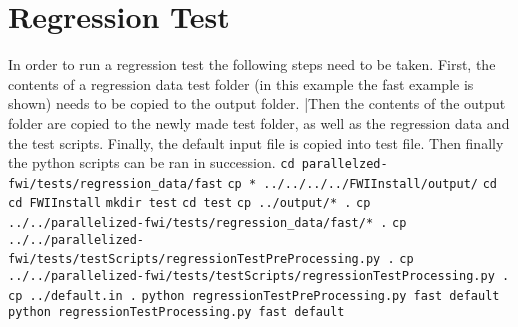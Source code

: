 \documentclass[10pt]{article}
\begin{document}
\section{Regression Test}
In order to run a regression test the following steps need to be taken. First, the contents of a regression data test folder (in this example the fast example is shown) needs to be copied to the output folder. |Then the contents of the output folder are copied to the newly made test folder, as well as the regression data and the test scripts. Finally, the default input file is copied into test file. Then finally the python scripts can be ran in succession.  
\newline
\texttt{cd parallelzed-fwi/tests/regression\_data/fast}
\newline
\texttt{cp * ../../../../FWIInstall/output/}
 \newline
\texttt{cd}
\newline
\texttt{cd FWIInstall}
\newline
\texttt{mkdir test}
 \newline
\texttt{cd test}
\newline
\texttt{cp ../output/* .}
\newline
\texttt{cp ../../parallelized-fwi/tests/regression\_data/fast/* .}
\newline
\texttt{cp ../../parallelized-fwi/tests/testScripts/regressionTestPreProcessing.py .}
\newline
\texttt{cp ../../parallelized-fwi/tests/testScripts/regressionTestProcessing.py .}
\newline
\texttt{cp ../default.in .}
\newline	
\texttt{python regressionTestPreProcessing.py fast default}
\newline
\texttt{python regressionTestProcessing.py fast default}
\end{document}
